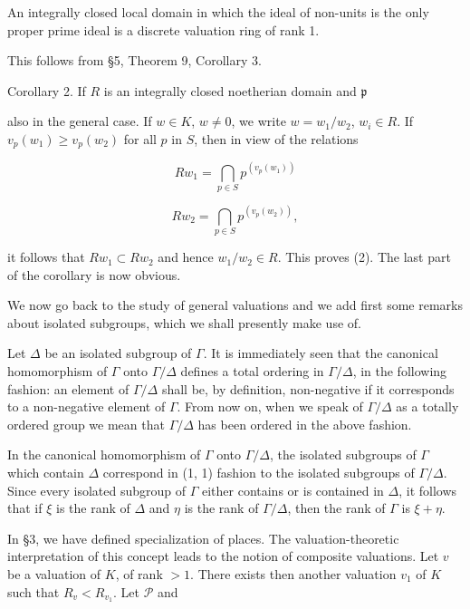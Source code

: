 An integrally closed local domain in which the ideal of non-units is the only proper prime ideal is a discrete valuation ring of rank 1.

This follows from §5, Theorem 9, Corollary 3.

Corollary 2. If $R$ is an integrally closed noetherian domain and $\mathfrak{p}$

also in the general case. If $w \in K$, $w \neq 0$, we write $w = w_1/w_2$, $w_i \in R$. If $v_p(w_1) \geq v_p(w_2)$ for all $p$ in $S$, then in view of the relations

$$Rw_1 = \bigcap_{p \in S} p^{(v_p(w_1))}$$

$$Rw_2 = \bigcap_{p \in S} p^{(v_p(w_2))},$$

it follows that $Rw_1 \subset Rw_2$ and hence $w_1/w_2 \in R$. This proves (2). The last part of the corollary is now obvious.

We now go back to the study of general valuations and we add first some remarks about isolated subgroups, which we shall presently make use of.

Let $\Delta$ be an isolated subgroup of $\Gamma$. It is immediately seen that the canonical homomorphism of $\Gamma$ onto $\Gamma/\Delta$ defines a total ordering in $\Gamma/\Delta$, in the following fashion: an element of $\Gamma/\Delta$ shall be, by definition, non-negative if it corresponds to a non-negative element of $\Gamma$. From now on, when we speak of $\Gamma/\Delta$ as a totally ordered group we mean that $\Gamma/\Delta$ has been ordered in the above fashion.

In the canonical homomorphism of $\Gamma$ onto $\Gamma/\Delta$, the isolated subgroups of $\Gamma$ which contain $\Delta$ correspond in (1, 1) fashion to the isolated subgroups of $\Gamma/\Delta$. Since every isolated subgroup of $\Gamma$ either contains or is contained in $\Delta$, it follows that if $\xi$ is the rank of $\Delta$ and $\eta$ is the rank of $\Gamma/\Delta$, then the rank of $\Gamma$ is $\xi + \eta$.

In §3, we have defined specialization of places. The valuation-theoretic interpretation of this concept leads to the notion of composite valuations. Let $v$ be a valuation of $K$, of rank $> 1$. There exists then another valuation $v_1$ of $K$ such that $R_v < R_{v_1}$. Let $\mathcal{P}$ and


